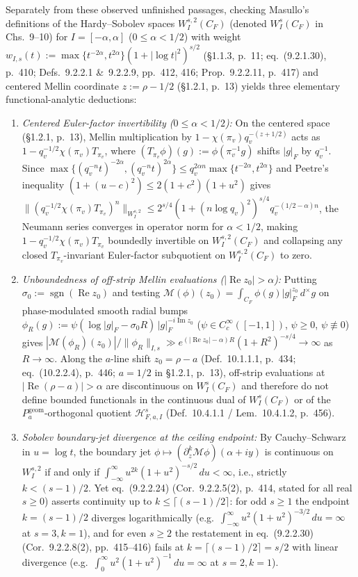 \documentclass[11pt]{amsart}
\newcommand{\re}{\operatorname{Re}}
\newcommand{\im}{\operatorname{Im}}
\theoremstyle{definition}
\theoremstyle{remark}
\begin{document}
Separately from these observed unfinished passages, checking Masullo's definitions of the Hardy--Sobolev spaces $W_I^{s,2}(C_F)$ (denoted $W_I^s(C_F)$ in Chs.~9--10) for $I=[-\alpha,\alpha]$ ($0\le\alpha<1/2$) with weight $w_{I,s}(t):=\max\{t^{-2\alpha},t^{2\alpha}\}(1+|\log t|^2)^{s/2}$ (\S 1.1.3, p.~11; eq.~(9.2.1.30), p.~410; Defs.~9.2.2.1 \&~9.2.2.9, pp.~412, 416; Prop.~9.2.2.11, p.~417) and centered Mellin coordinate $z:=\rho-1/2$ (\S 1.2.1, p.~13) yields three elementary functional-analytic deductions:
\begin{enumerate}\setlength{\itemsep}{1pt}\setlength{\parskip}{0pt}
\item \emph{Centered Euler-factor invertibility ($0\le\alpha<1/2$):} On the centered space (\S 1.2.1, p.~13), Mellin multiplication by $1-\chi(\pi_v)q_v^{-(z+1/2)}$ acts as $1-q_v^{-1/2}\chi(\pi_v)T_{\pi_v}$, where $(T_{\pi_v}\phi)(g):=\phi(\pi_v^{-1}g)$ shifts $|g|_F$ by $q_v^{-1}$. Since $\max\{(q_v^{-n}t)^{-2\alpha},(q_v^{-n}t)^{2\alpha}\}\le q_v^{2\alpha n}\max\{t^{-2\alpha},t^{2\alpha}\}$ and Peetre's inequality $(1+(u-c)^2)\le 2(1+c^2)(1+u^2)$ gives $\|(q_v^{-1/2}\chi(\pi_v)T_{\pi_v})^n\|_{W_I^{s,2}}\le 2^{s/4}(1+(n\log q_v)^2)^{s/4}q_v^{-(1/2-\alpha)n}$, the Neumann series converges in operator norm for $\alpha<1/2$, making $1-q_v^{-1/2}\chi(\pi_v)T_{\pi_v}$ boundedly invertible on $W_I^{s,2}(C_F)$ and collapsing any closed $T_{\pi_v}$-invariant Euler-factor subquotient on $W_I^{s,2}(C_F)$ to zero.
\item \emph{Unboundedness of off-strip Mellin evaluations ($|\re z_0|>\alpha$):} Putting $\sigma_0:=\operatorname{sgn}(\re z_0)$ and testing $\mathcal{M}(\phi)(z_0)=\int_{C_F}\phi(g)|g|_F^{z_0}\,d^\times g$ on phase-modulated smooth radial bumps $\phi_R(g):=\psi(\log|g|_F-\sigma_0 R)\,|g|_F^{-i\im z_0}$ ($\psi\in C_c^\infty([-1,1])$, $\psi\ge 0$, $\psi\not\equiv 0$) gives $|\mathcal{M}(\phi_R)(z_0)|/\|\phi_R\|_{I,s}\gg e^{(|\re z_0|-\alpha)R}(1+R^2)^{-s/4}\to\infty$ as $R\to\infty$. Along the $a$-line shift $z_0=\rho-a$ (Def.~10.1.1.1, p.~434; eq.~(10.2.2.4), p.~446; $a=1/2$ in \S 1.2.1, p.~13), off-strip evaluations at $|\re(\rho-a)|>\alpha$ are discontinuous on $W_I^s(C_F)$ and therefore do not define bounded functionals in the continuous dual of $W_I^s(C_F)$ or of the $P_a^{\mathrm{geom}}$-orthogonal quotient $\mathcal{H}_{F,a,I}^s$ (Def.~10.4.1.1 / Lem.~10.4.1.2, p.~456).
\item \emph{Sobolev boundary-jet divergence at the ceiling endpoint:} By Cauchy--Schwarz in $u=\log t$, the boundary jet $\phi\mapsto(\partial_z^k\mathcal{M}\phi)(\alpha+iy)$ is continuous on $W_I^{s,2}$ if and only if $\int_{-\infty}^{\infty}u^{2k}(1+u^2)^{-s/2}\,du<\infty$, i.e., strictly $k<(s-1)/2$. Yet eq.~(9.2.2.24) (Cor.~9.2.2.5(2), p.~414, stated for all real $s\ge 0$) asserts continuity up to $k\le\lceil(s-1)/2\rceil$: for odd $s\ge 1$ the endpoint $k=(s-1)/2$ diverges logarithmically (e.g.\ $\int_{-\infty}^{\infty} u^2(1+u^2)^{-3/2}\,du=\infty$ at $s=3,k=1$), and for even $s\ge 2$ the restatement in eq.~(9.2.2.30) (Cor.~9.2.2.8(2), pp.~415--416) fails at $k=\lceil(s-1)/2\rceil=s/2$ with linear divergence (e.g.\ $\int_0^{\infty} u^2(1+u^2)^{-1}\,du=\infty$ at $s=2,k=1$).
\end{enumerate}
\end{document}
